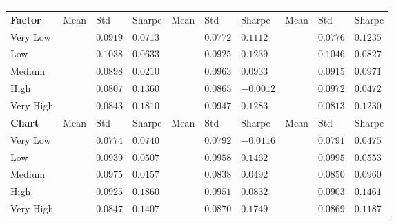 \renewcommand{\maxnum}{0.0172}
\begin{tabularx}{\linewidth}{*{10}{X}}
\toprule
& & & \\
\midrule
\textbf{Factor} & Mean & Std & Sharpe & Mean & Std & Sharpe & Mean & Std & Sharpe \\
\midrule
Very Low & $^{}$ & $0.0919$ & $0.0713$ & $^{}$ & $0.0772$ & $0.1112$ & $^{}$ & $0.0776$ & $0.1235$ \\
Low & $^{}$ & $0.1038$ & $0.0633$& $^{}$ & $0.0925$ & $0.1239$ & $^{}$ & $0.1046$ & $0.0827$\\
Medium & $^{}$ & $0.0898$ & $0.0210$& $^{}$ & $0.0963$ & $0.0933$ & $^{}$ & $0.0915$ & $0.0971$\\
High & $^{}$ & $0.0807$ & $0.1360$&$^{}$ & $0.0865$ & $-0.0012$ & $^{}$ & $0.0972$ & $0.0472$\\
Very High & $^{}$ & $0.0843$ & $0.1810$& $^{}$ & $0.0947$ & $0.1283$ & $^{}$ & $0.0813$ & $0.1230$\\
\midrule
\textbf{Chart} & Mean & Std & Sharpe & Mean & Std & Sharpe & Mean & Std & Sharpe \\
\midrule
Very Low & $^{}$ & $0.0774$ & $0.0740$& $^{}$ & $0.0792$ & $-0.0116$ & $^{}$ & $0.0791$ & $0.0475$\\
Low & $^{}$ & $0.0939$ & $0.0507$& $^{}$ & $0.0958$ & $0.1462$ & $^{}$ & $0.0995$ & $0.0553$\\
Medium & $^{}$ & $0.0975$ & $0.0157$& $^{}$ & $0.0838$ & $0.0492$ & $^{}$ & $0.0850$ & $0.0960$\\
High & $^{}$ & $0.0925$ & $0.1860$& $^{}$ & $0.0951$ & $0.0832$ & $^{}$ & $0.0903$ & $0.1461$\\
Very High & $^{}$ & $0.0847$ & $0.1407$& $^{}$ & $0.0870$ & $0.1749$ & $^{}$ & $0.0869$ & $0.1187$\\

\end{tabularx}
